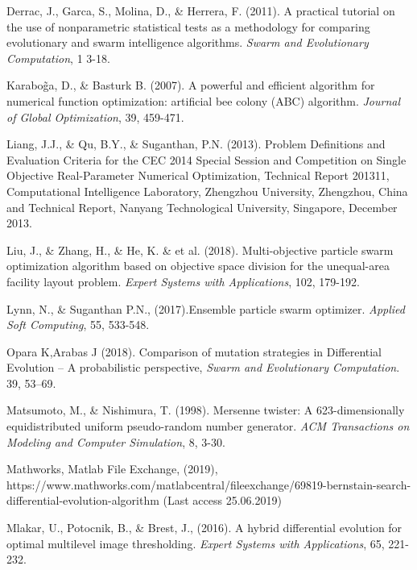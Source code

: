 \documentclass[preprint,10pt,3p]{elsarticle}
\begin{document}
\begin{thebibliography}{00}
 Derrac, J., Garca, S., Molina, D.,  \& Herrera, F. (2011). A practical tutorial on the use of nonparametric statistical tests as a methodology for comparing evolutionary and swarm intelligence algorithms. \emph{Swarm and Evolutionary Computation}, 1 3-18.

 Karabo\~{g}a, D., \& Basturk B. (2007). A powerful and efficient algorithm for numerical function optimization: artificial bee colony (ABC) algorithm.  \emph{Journal of Global Optimization}, 39, 459-471.

 Liang, J.J., \& Qu, B.Y., \&  Suganthan,  P.N. (2013). Problem Definitions and Evaluation Criteria for the CEC 2014 Special Session and Competition on Single Objective Real-Parameter Numerical Optimization, Technical Report 201311, Computational Intelligence Laboratory, Zhengzhou University, Zhengzhou, China  and  Technical Report, Nanyang Technological University, Singapore, December 2013.

 Liu, J., \& Zhang, H., \& He, K. \& et al. (2018). Multi-objective particle swarm optimization algorithm based on objective space division for the unequal-area facility layout problem. \emph{Expert Systems with Applications}, 102, 179-192.

 Lynn, N., \& Suganthan P.N., (2017).Ensemble particle swarm optimizer.  \emph{Applied Soft Computing}, 55, 533-548.

 Opara K,Arabas J (2018). Comparison of mutation strategies in Differential Evolution – A probabilistic perspective, \emph{Swarm and Evolutionary Computation}. 39, 53–69.

  Matsumoto, M., \& Nishimura, T. (1998). Mersenne twister: A 623-dimensionally equidistributed uniform pseudo-random number generator. \emph{ACM Transactions on Modeling and Computer Simulation}, 8, 3-30.

   Mathworks, Matlab File Exchange, (2019), https://www.mathworks.com/matlabcentral/fileexchange/69819-bernstain-search-differential-evolution-algorithm    (Last access 25.06.2019)

   Mlakar, U., Potocnik, B.,  \& Brest, J., (2016). A hybrid differential evolution for optimal multilevel image thresholding. \emph{Expert Systems with Applications},  65, 221-232.


\end{thebibliography}
\end{document}
